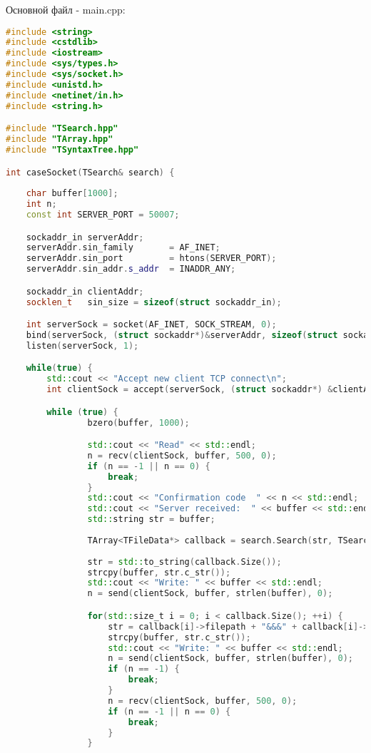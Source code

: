 Основной файл - main.cpp:
\begin{lstlisting}[language=C++]
#include <string>
#include <cstdlib>
#include <iostream>
#include <sys/types.h>
#include <sys/socket.h>
#include <unistd.h>
#include <netinet/in.h>
#include <string.h>

#include "TSearch.hpp"
#include "TArray.hpp"
#include "TSyntaxTree.hpp"

int caseSocket(TSearch& search) {
    
    char buffer[1000];
    int n;
    const int SERVER_PORT = 50007;

    sockaddr_in serverAddr;
    serverAddr.sin_family       = AF_INET;
    serverAddr.sin_port         = htons(SERVER_PORT);
    serverAddr.sin_addr.s_addr  = INADDR_ANY;

    sockaddr_in clientAddr;
    socklen_t   sin_size = sizeof(struct sockaddr_in);

    int serverSock = socket(AF_INET, SOCK_STREAM, 0);
    bind(serverSock, (struct sockaddr*)&serverAddr, sizeof(struct sockaddr));
    listen(serverSock, 1);

    while(true) {
        std::cout << "Accept new client TCP connect\n";
        int clientSock = accept(serverSock, (struct sockaddr*) &clientAddr, &sin_size);

        while (true) {
                bzero(buffer, 1000);

                std::cout << "Read" << std::endl;
                n = recv(clientSock, buffer, 500, 0);
                if (n == -1 || n == 0) {
                    break;
                }
                std::cout << "Confirmation code  " << n << std::endl;
                std::cout << "Server received:  " << buffer << std::endl;
                std::string str = buffer;
                
                TArray<TFileData*> callback = search.Search(str, TSearch::REV_INDEX);
                
                str = std::to_string(callback.Size());
                strcpy(buffer, str.c_str());
                std::cout << "Write: " << buffer << std::endl;
                n = send(clientSock, buffer, strlen(buffer), 0);

                for(std::size_t i = 0; i < callback.Size(); ++i) {
                    str = callback[i]->filepath + "&&&" + callback[i]->title + "&&&" + std::to_string(callback[i]->score);
                    strcpy(buffer, str.c_str());
                    std::cout << "Write: " << buffer << std::endl;
                    n = send(clientSock, buffer, strlen(buffer), 0);
                    if (n == -1) {
                        break;
                    }
                    n = recv(clientSock, buffer, 500, 0);
                    if (n == -1 || n == 0) {
                        break;
                    }
                }


\end{lstlisting}
